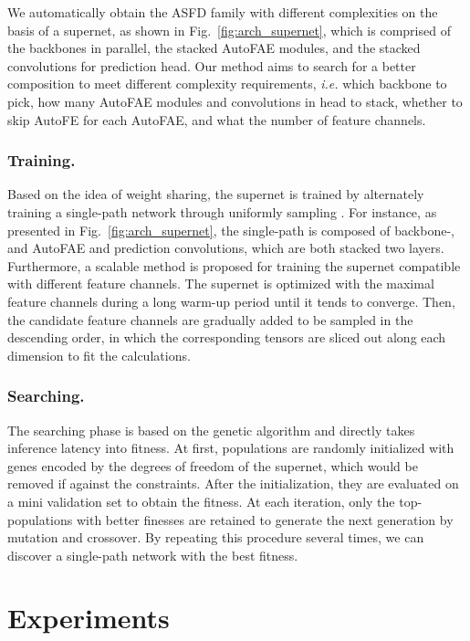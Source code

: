 \documentclass[sigconf]{acmart}
\begin{document}
We automatically obtain the ASFD family with different complexities on the basis of a supernet, as shown in Fig.~\ref{fig:arch_supernet}, which is comprised of the backbones in parallel, the stacked AutoFAE modules, and the stacked convolutions for prediction head. Our method aims to search for a better composition to meet different complexity requirements, \textit{i.e.} which backbone to pick, how many AutoFAE modules and convolutions in head to stack, whether to skip AutoFE for each AutoFAE, and what the number of feature channels.

\subsubsection{Training.}
Based on the idea of weight sharing, the supernet is trained by alternately training a single-path network through uniformly sampling \cite{guo2019spos,chu2019fairnas}.
For instance, as presented in Fig.~\ref{fig:arch_supernet}, the single-path is composed of backbone-, and AutoFAE and prediction convolutions, which are both stacked two layers. 
Furthermore, a scalable method is proposed for training the supernet compatible with different feature channels. The supernet is optimized with the maximal feature channels during a long warm-up period until it tends to converge. Then, the candidate feature channels are gradually added to be sampled in the descending order, in which the corresponding tensors are sliced out along each dimension to fit the calculations.


\subsubsection{Searching.}
The searching phase is based on the genetic algorithm \cite{guo2019spos,chen2019detnas,chu2019fairnas} and directly takes inference latency into fitness. At first, populations are randomly initialized with genes encoded by the  degrees of freedom of the supernet, which would be removed if against the constraints. After the initialization, they are evaluated on a mini validation set to obtain the fitness. At each iteration, only the top- populations with better finesses are retained to generate the next generation by mutation and crossover. By repeating this procedure several times, we can discover a single-path network with the best fitness.


\section{Experiments}
\end{document}
